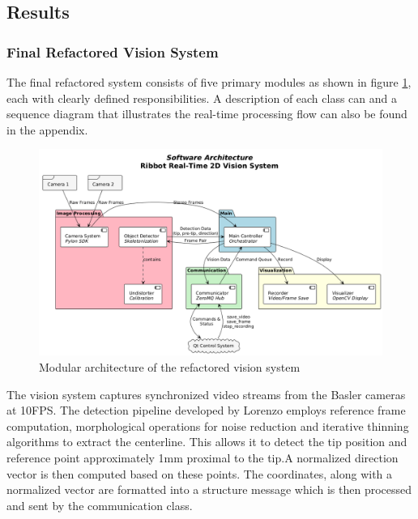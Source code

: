 \subsection{Results}

\subsubsection{Final Refactored Vision System}
The final refactored system consists of five primary modules as shown in figure \ref{fig:visioncode}, each with clearly defined responsibilities. A description of each class can and a sequence diagram that illustrates the real-time processing flow can also be found in the appendix.

\begin{figure} [H]
    \centering
    \includegraphics[width=\linewidth]{images/Software documentation/visionmodules.png}
    \caption{Modular architecture of the refactored vision system}
    \label{fig:visioncode}
\end{figure}

The vision system captures synchronized video streams from the Basler cameras at 10FPS.  The detection pipeline developed by Lorenzo employs reference frame computation, morphological operations for noise reduction and iterative thinning algorithms to extract the centerline. This allows it to detect the tip position and reference point approximately 1mm proximal to the tip.A normalized direction vector is then computed based on these points. The coordinates, along with a normalized vector are formatted into a structure message which is then processed and sent by the communication class.


